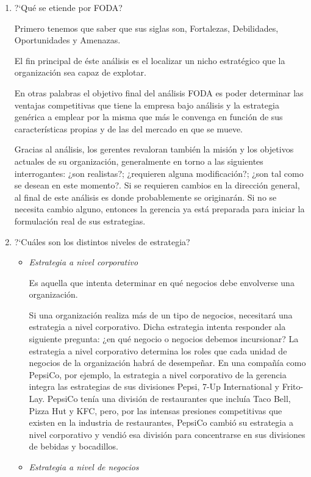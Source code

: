 \begin{enumerate}
	\item ?`Qu\'e se etiende por FODA?

        Primero tenemos que saber que sus siglas son, Fortalezas, Debilidades, Oportunidades y Amenazas.

	El fin principal de \'este an\'alisis es el localizar un nicho estrat\'egico que la organizaci\'on sea capaz de explotar.

	En otras palabras el objetivo final del an\'alisis FODA es poder determinar las ventajas competitivas que tiene la empresa
	bajo an\'alisis y la estrategia gen\'erica a emplear por la misma que m\'as le convenga en funci\'on de sus caracter\'isticas propias
	y de las del mercado en que se mueve.

	Gracias al an\'alisis, los gerentes revaloran tambi\'en la misi\'on y los objetivos actuales de su organizaci\'on, generalmente en
	torno a las siguientes interrogantes: ¿son realistas?; ¿requieren alguna modificaci\'on?; ¿son tal como se desean en este momento?.
	Si se requieren cambios en la direcci\'on general, al final de este an\'alisis es donde probablemente se originar\'an. Si no se necesita
	cambio alguno, entonces la gerencia ya est\'a preparada para iniciar la formulaci\'on real de sus estrategias.

	\item ?`Cu\'ales son los distintos niveles de estrategia?

	\begin{itemize}
		\item \emph{Estrategia a nivel corporativo}

		Es aquella que intenta determinar en qu\'e negocios debe envolverse una organizaci\'on.
		
		Si una organizaci\'on realiza m\'as de un tipo de negocios, necesitar\'a una estrategia a nivel
		corporativo. Dicha estrategia intenta responder ala siguiente pregunta: ¿en qu\'e negocio o
		negocios debemos incursionar? La estrategia a nivel corporativo determina los roles que cada
		unidad de negocios de la organizaci\'on habr\'a de desempe\~nar. En una compa\~n\'ia como PepsiCo, por ejemplo,
		la estrategia a nivel corporativo de la gerencia integra las estrategias de sus divisiones Pepsi,
		7-Up International y Frito-Lay. PepsiCo ten\'ia una divisi\'on de restaurantes que inclu\'ia Taco Bell,
		Pizza Hut y KFC, pero, por las intensas presiones competitivas que existen en la industria de
		restaurantes, PepsiCo cambi\'o su estrategia a nivel corporativo y vendi\'o esa divisi\'on para concentrarse
		en sus divisiones de bebidas y bocadillos.
		\item \emph{Estrategia a nivel de negocios}


\end{itemize}
\end{enumerate}
